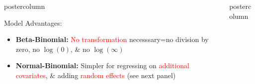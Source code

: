 \documentclass[final]{beamer}\usepackage[]{graphicx}\usepackage[]{color}
\newcommand{\red}{\textcolor{red}}
\newlength{\columnheight}\setlength{\columnheight}{75cm} %
\begin{document}
{\begin{frame}
\begin{columns}
\begin{column}{.33\textwidth}
\begin{beamercolorbox}[center,wd=\textwidth]{postercolumn}
\begin{minipage}[T]{.97\textwidth}
{%
\begin{block}{Model Advantages:}
\begin{itemize}
  \item {\bf Beta-Binomial: }\red{No transformation} necesssary=no division by zero, no $\log(0)$, \& no $\log(\infty)$
  \item {\bf Normal-Binomial: }Simpler for regressing on \red{additional covariates}, \& adding \red{random effects} (see next panel)
\end{itemize}





	

\vspace{3mm}

\end{block}

}


\end{minipage}
\end{beamercolorbox}
\end{column}
\begin{column}{.33\textwidth}
\begin{beamercolorbox}[center,wd=\textwidth]{postercolumn}
\begin{minipage}[T]{.97\textwidth}  %
\parbox[t][\columnheight]{\textwidth}{ %



}
\end{minipage}
\end{beamercolorbox}
\end{column}
\end{columns}
\end{frame}}
\end{document}
